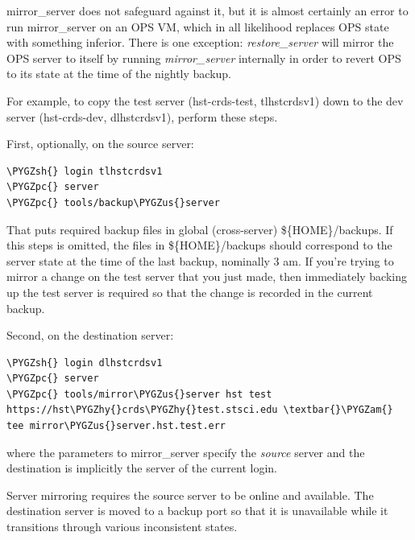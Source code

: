 \documentclass[letterpaper,10pt,english]{sphinxmanual}
\def\PYGZus{\char`\_}
\def\PYGZam{\char`\&}
\def\PYGZsh{\char`\#}
\def\PYGZpc{\char`\%}
\def\PYGZhy{\char`\-}
\begin{document}
mirror\_server does not safeguard against it,  but it is almost certainly an error to run mirror\_server on an
OPS VM,  which in all likelihood replaces OPS state with something inferior.   There is one exception:  \emph{restore\_server}
will mirror the OPS server to itself by running \emph{mirror\_server} internally in order to revert OPS to its state at the
time of the nightly backup.

For example,  to copy the test server (hst-crds-test, tlhstcrdsv1) down to the dev server (hst-crds-dev, dlhstcrdsv1),
perform these steps.

First, optionally, on the source server:

\begin{Verbatim}[commandchars=\\\{\}]
\PYGZsh{} login tlhstcrdsv1
\PYGZpc{} server
\PYGZpc{} tools/backup\PYGZus{}server
\end{Verbatim}

That puts required backup files in global (cross-server) \$\{HOME\}/backups.  If this steps is omitted,  the files in
\$\{HOME\}/backups should correspond to the server state at the time of the last backup,  nominally 3 am.  If you're trying
to mirror a change on the test server that you just made,  then immediately backing up the test server is required so
that the change is recorded in the current backup.

Second, on the destination server:

\begin{Verbatim}[commandchars=\\\{\}]
\PYGZsh{} login dlhstcrdsv1
\PYGZpc{} server
\PYGZpc{} tools/mirror\PYGZus{}server hst test https://hst\PYGZhy{}crds\PYGZhy{}test.stsci.edu \textbar{}\PYGZam{} tee mirror\PYGZus{}server.hst.test.err
\end{Verbatim}

where the parameters to mirror\_server specify the \emph{source} server and the destination is implicitly the
server of the current login.

Server mirroring requires the source server to be online and available.   The destination server is moved
to a backup port so that it is unavailable while it transitions through various inconsistent states.



\renewcommand{\indexname}{Index}
\printindex
\end{document}
